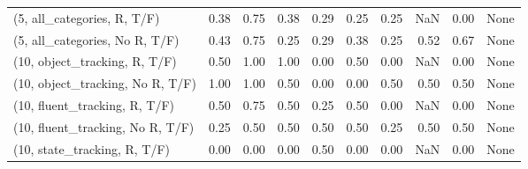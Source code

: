 \begin{table*}[h!]
\begin{adjustbox}{width=2\columnwidth,center}
\begin{tabular}{lrrr|rrr|rrr}
(5, all\_categories, R, T/F)          &                      0.38 &                  0.75 &                      0.38 &                          0.29 &                      0.25 &                          0.25 &                                    NaN &                               0.00 &                                  None \\
(5, all\_categories, No R, T/F)       &                      0.43 &                  0.75 &                      0.25 &                          0.29 &                      0.38 &                          0.25 &                                   0.52 &                               0.67 &                                  None \\



\midrule
(10, object\_tracking, R, T/F)         &                      0.50 &                  1.00 &                      1.00 &                          0.00 &                      0.50 &                          0.00 &                                    NaN &                               0.00 &                                  None \\
(10, object\_tracking, No R, T/F)      &                      1.00 &                  1.00 &                      0.50 &                          0.00 &                      0.00 &                          0.50 &                                   0.50 &                               0.50 &                                  None \\
(10, fluent\_tracking, R, T/F)         &                      0.50 &                  0.75 &                      0.50 &                          0.25 &                      0.50 &                          0.00 &                                    NaN &                               0.00 &                                  None \\
(10, fluent\_tracking, No R, T/F)      &                      0.25 &                  0.50 &                      0.50 &                          0.50 &                      0.50 &                          0.25 &                                   0.50 &                               0.50 &                                  None \\
(10, state\_tracking, R, T/F)          &                      0.00 &                  0.00 &                      0.00 &                          0.50 &                      0.00 &                          0.00 &                                    NaN &                               0.00 &                                  None \\

\end{tabular}
\end{adjustbox}
\end{table*}
